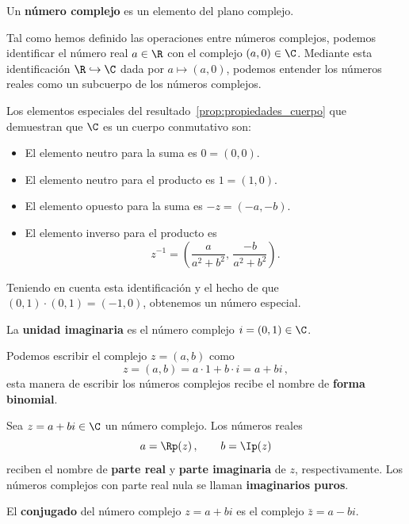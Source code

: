 \begin{defi}
  Un \textbf{número complejo} es un elemento del plano complejo.
\end{defi}

Tal como hemos definido las operaciones entre números complejos, podemos identificar el número real $a\in\R$ con el complejo $(a,0)\in\C$. Mediante esta identificación $\R\hookrightarrow\C$ dada por $a\mapsto(a,0)$, podemos entender los números reales como un subcuerpo de los números complejos.

\begin{eje}
  Los elementos especiales del resultado~\ref{prop:propiedades_cuerpo} que demuestran que $\C$ es un cuerpo conmutativo son:
  \begin{itemize}
    \item El elemento neutro para la suma es $0 = (0, 0)$.
    \item El elemento neutro para el producto es $1 = (1, 0)$.
    \item El elemento opuesto para la suma es $-z = (-a,-b)$.
    \item El elemento inverso para el producto es
          \[
            z^{-1} = \left(\frac{a}{a^2+b^2},\, \frac{-b}{a^2+b^2}\right).
          \]
  \end{itemize}
\end{eje}

Teniendo en cuenta esta identificación y el hecho de que $(0,1)\cdot(0,1) = (-1,0)$, obtenemos un número especial.

\begin{defi}
  La \textbf{unidad imaginaria} es el número complejo $i = (0,1)\in\C$.
\end{defi}

Podemos escribir el complejo $z = (a,b)$ como
\[
  z = (a, b) = a\cdot 1 + b\cdot i = a + bi\,,
\]
esta manera de escribir los números complejos recibe el nombre de \textbf{forma binomial}.

\begin{defi}
  Sea $z = a+bi\in\C$ un número complejo. Los números reales
  \[ a = \Rp(z)\,,\qquad b = \Ip(z) \]
  reciben el nombre de \textbf{parte real} y \textbf{parte imaginaria} de $z$, respectivamente. Los números complejos con parte real nula se llaman \textbf{imaginarios puros}.
\end{defi}

\begin{defi}[Conjugación]
  El \textbf{conjugado} del número complejo $z = a+bi$ es el complejo $\bar z = a-bi$.
\end{defi}

